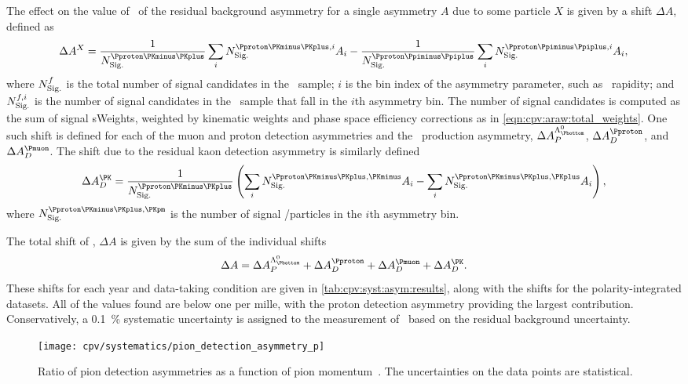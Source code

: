The effect on the value of \dACP\ of the residual background asymmetry for a
single asymmetry $A$ due to some particle $X$ is given by a shift $\Delta{A}$,
defined as
\begin{equation}
  \Delta{A}^{X} = \frac{1}{\nsig^{\pKK}}\sum_{i} \nsig^{\pKK,i} A_{i} -
    \frac{1}{\nsig^{\ppipi}}\sum_{i} \nsig^{\ppipi,i} A_{i},
\end{equation}
where $N_{\text{Sig.}}^{f}$ is the total number of signal candidates in the \LcTof\ sample; $i$ is the bin index of the asymmetry parameter, such as \PLambdab\ rapidity; and $N_{\text{Sig.}}^{f,i}$ is the number of signal candidates in the \LcTof\ sample that fall in the $i$th asymmetry bin.
The number of signal candidates is computed as the sum of signal sWeights, weighted by kinematic weights and phase space efficiency corrections as in \cref{eqn:cpv:araw:total_weights}.
One such shift is defined for each of the muon and proton detection asymmetries
and the \PLambdab\ production asymmetry, $\Delta\APLb$, $\Delta\ADp$, and
$\Delta\ADmu$.
The shift due to the residual kaon detection asymmetry is similarly defined
\begin{equation}
  \Delta{\ADK} = \frac{1}{\nsig^{\pKK}}\left(%
    \sum_{i} \nsig^{\pKK,\PKminus} A_{i} -
    \sum_{i} \nsig^{\pKK,\PKplus} A_{i}
  \right),
\end{equation}
where $\nsig^{\pKK,\PKpm}$ is the number of signal \PKplus/\PKminus particles in the $i$th asymmetry bin.

The total shift of \dACP, $\Delta{A}$ is given by the sum of the individual shifts
\begin{equation}
  \Delta{A} = \Delta\APLb + \Delta\ADp + \Delta\ADmu + \Delta\ADK.
\end{equation}
These shifts for each year and data-taking condition are given in \cref{tab:cpv:syst:asym:results}, along with the shifts for the polarity-integrated datasets.
All of the values found are below one per mille, with the proton detection asymmetry providing the largest contribution.
Conservatively, a \SI{0.1}{\percent} systematic uncertainty is assigned to the measurement of \dACP\ based on the residual background uncertainty.

\begin{figure}
  \centering
  \texttt{[image: cpv/systematics/pion\_detection\_asymmetry\_p]}
  \caption{%
    Ratio of pion detection asymmetries as a function of pion
    momentum~\cite{Aaij:2012cy}.
    The uncertainties on the data points are statistical.
  }
  \label{fig:cpv:syst:asym:pion}
\end{figure}

